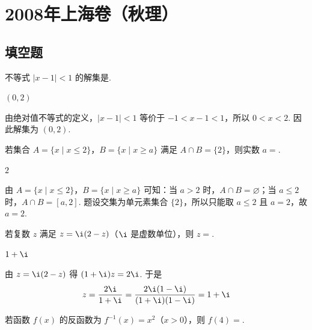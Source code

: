 \chapter{2008年上海卷（秋理）}

\section{填空题}

\begin{problem}
不等式 \( |x - 1| < 1 \) 的解集是\fillinblank{}.
\end{problem}

\begin{answer}
\( (0,2) \)
\end{answer}

\begin{solution}
由绝对值不等式的定义，\( |x-1|<1 \) 等价于 \(-1<x-1<1\)，所以 \(0<x<2\). 因此解集为 \((0,2)\).
\end{solution}

\begin{problem}
若集合 \(A = \{x \mid x \leq 2\}\)，\(B = \{x \mid x \geqslant a\}\) 满足 \(A \cap B = \{2\}\)，则实数 \(a = \)\fillinblank{}.
\end{problem}

\begin{answer}
\(2\)
\end{answer}

\begin{solution}
由 \(A=\{x\mid x\leqslant2\}\)，\(B=\{x\mid x\geqslant a\}\) 可知：当 \(a>2\) 时，\(A\cap B=\varnothing\)；当 \(a\leqslant2\) 时，\(A\cap B=[a,2]\). 题设交集为单元素集合 \(\{2\}\)，所以只能取 \(a\leqslant2\) 且 \(a=2\)，故 \(a=2\).
\end{solution}

\begin{problem}
若复数 \(z\) 满足 \( z = \i(2 - z) \)（\(\i\) 是虚数单位），则 \(z=\)\fillinblank{}.
\end{problem}

\begin{answer}
\(1+\i\)
\end{answer}

\begin{solution}
由 \(z=\i(2-z)\) 得 \((1+\i)z=2\i\). 于是
\[
z=\frac{2\i}{1+\i}=\frac{2\i(1-\i)}{(1+\i)(1-\i)}=1+\i
\]
\end{solution}

\begin{problem}
若函数 \( f(x) \) 的反函数为 \( f^{-1}(x) = x^2 \)（\(x > 0\)），则 \( f(4) = \)\fillinblank{}.
\end{problem}

